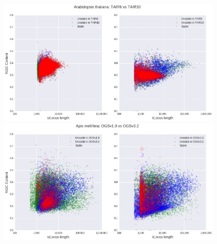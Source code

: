 \begin{figure}[h]
\centering
\includegraphics[width=6in]{Assets/Graphics/iLoci/atha-stable-scatter.png}
\includegraphics[width=6in]{Assets/Graphics/iLoci/amel-stable-scatter.png}
\caption{~}
\label{Fig:iLociStableScatter}
\end{figure}

\clearpage

